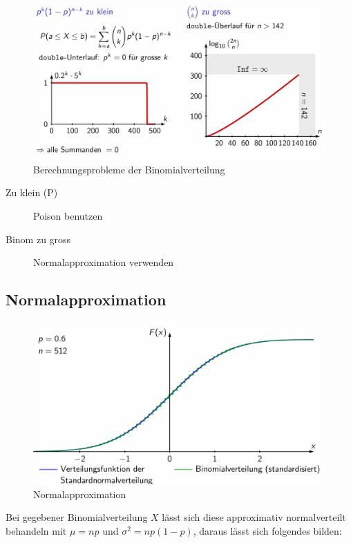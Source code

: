 \documentclass[../Main.tex]{subfiles}
\begin{document}
\begin{figure}[H]
    \centering
    \includegraphics[width=0.75\linewidth]{Images/binom-berechnungsprobleme.png}
    \caption{Berechnungsprobleme der Binomialverteilung}
\end{figure}
\begin{description}
    \item[Zu klein (P)] Poison benutzen
    \item[Binom zu gross] Normalapproximation verwenden
\end{description}

\subsection{Normalapproximation}

\begin{figure}[H]
    \centering
    \includegraphics[width=0.75\linewidth]{Images/normalapproximation.png}
    \caption{Normalapproximation}
\end{figure}

Bei gegebener Binomialverteilung \(X\) lässt sich diese approximativ normalverteilt behandeln mit
\(\mu = np\) und \(\sigma^2 = np (1-p)\), daraus lässt sich folgendes bilden:
\end{document}
